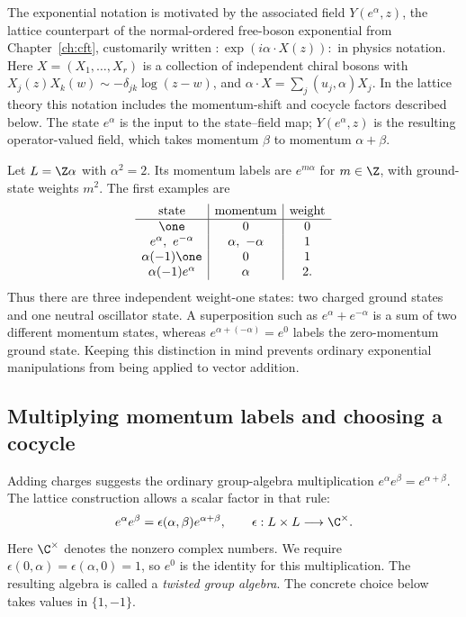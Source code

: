 The exponential notation is motivated by the associated field
$Y(e^\alpha,z)$, the lattice counterpart of the normal-ordered
free-boson exponential from Chapter~\ref{ch:cft}, customarily written
$:\!\exp(i\alpha\cdot X(z))\!:$ in physics notation.
Here $X=(X_1,\ldots,X_r)$ is a collection of independent chiral
bosons with $X_j(z)X_k(w)\sim-\delta_{jk}\log(z-w)$, and
$\alpha\cdot X=\sum_j(u_j,\alpha)X_j$. In the lattice theory
this notation includes the momentum-shift and cocycle factors
described below. The state $e^\alpha$ is the input to the
state--field map; $Y(e^\alpha,z)$ is the resulting operator-valued
field, which takes momentum $\beta$ to momentum $\alpha+\beta$.

\begin{example}
\label{ex:voa-momentum-labels}
Let $L=\Z\alpha$ with $\alpha^2=2$. Its momentum labels are
$e^{m\alpha}$ for $m\in\Z$, with ground-state weights $m^2$.
The first examples are
\[
\begin{array}{c|c|c}
 \text{state}&\text{momentum}&\text{weight}\\ \hline
 \one&0&0\\
 e^\alpha,\ e^{-\alpha}&\alpha,\ -\alpha&1\\
 \alpha(-1)\one&0&1\\
 \alpha(-1)e^\alpha&\alpha&2.
\end{array}
\]
Thus there are three independent weight-one states: two charged
ground states and one neutral oscillator state. A superposition such
as $e^\alpha+e^{-\alpha}$ is a sum of two different momentum
states, whereas $e^{\alpha+(-\alpha)}=e^0$ labels the zero-momentum
ground state. Keeping this distinction in mind prevents ordinary
exponential manipulations from being applied to vector addition.
\end{example}

\subsection{Multiplying momentum labels and choosing a cocycle}

Adding charges suggests the ordinary group-algebra multiplication
$e^\alpha e^\beta=e^{\alpha+\beta}$. The lattice construction
allows a scalar factor in that rule:
\[
 e^\alpha e^\beta=\epsilon(\alpha,\beta)e^{\alpha+\beta},
 \qquad \epsilon:L\times L\longrightarrow\C^\times.
\]
Here $\C^\times$ denotes the nonzero complex numbers. We require
$\epsilon(0,\alpha)=\epsilon(\alpha,0)=1$, so $e^0$ is the
identity for this multiplication. The resulting algebra is called
a \emph{twisted group algebra}. The concrete choice below takes
values in $\{1,-1\}$.

